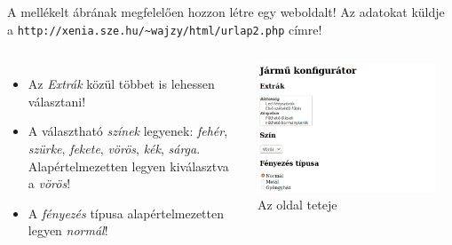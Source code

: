 \begin{frame}
  \scriptsize
  A mellékelt ábrának megfelelően hozzon létre egy weboldalt! Az adatokat küldje a \texttt{http://xenia.sze.hu/\textasciitilde wajzy/html/urlap2.php} címre!
  \begin{columns}[c]
      \begin{itemize}
        \item Az \emph{Extrák} közül többet is lehessen választani!
        \item A választható \emph{színek} legyenek: \emph{fehér}, \emph{szürke}, 
        \emph{fekete}, \emph{vörös}, \emph{kék}, \emph{sárga}. Alapértelmezetten legyen 
        kiválasztva a \emph{vörös}!
        \item A \emph{fényezés} típusa alapértelmezetten legyen 
        \emph{normál}!
      \end{itemize}
      \begin{exampleblock}{\small {}}
        \vspace{-.5cm}
        \begin{columns}[T]
            \begin{center}
              \includegraphics[width=\textwidth]{urlap8-1.png}\\
              \tiny Az oldal teteje
            \end{center}
            \begin{center}

\end{center}
\end{columns}
\end{exampleblock}
\end{columns}
\end{frame}
